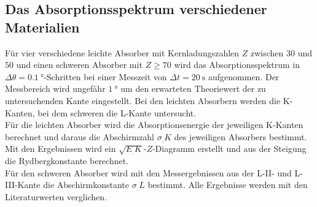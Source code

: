 \subsection{Das Absorptionsspektrum verschiedener Materialien}

Für vier verschiedene leichte Absorber mit Kernladungszahlen $Z$ zwischen $30$ und $50$ und einen schweren Absorber mit $Z \geq 70$ wird das Absorptionsspektrum in $\Delta\theta=\SI{0.1}{\degree}$-Schritten bei einer Messzeit von $\Delta t=\SI{20}{\second}$ aufgenommen. Der Messbereich wird ungefähr $\SI{1}{\degree}$ um den erwarteten Theoriewert der zu untersuchenden Kante eingestellt. Bei den leichten Absorbern werden die K-Kanten, bei dem schweren die L-Kante untersucht.\\
Für die leichten Absorber wird die Absorptionsenergie der jeweiligen K-Kanten berechnet und daraus die Abschirmzahl $\sigma_.K$ des jeweiligen Absorbers bestimmt. Mit den Ergebnissen wird ein $\sqrt{E_.K}$-$Z$-Diagramm erstellt und aus der Steigung die Rydbergkonstante berechnet.\\
Für den schweren Absorber wird mit den Messergebnissen aus der L-II- und L-III-Kante die Abschirmkonstante $\sigma_.L$ bestimmt.
Alle Ergebnisse werden mit den Literaturwerten verglichen.